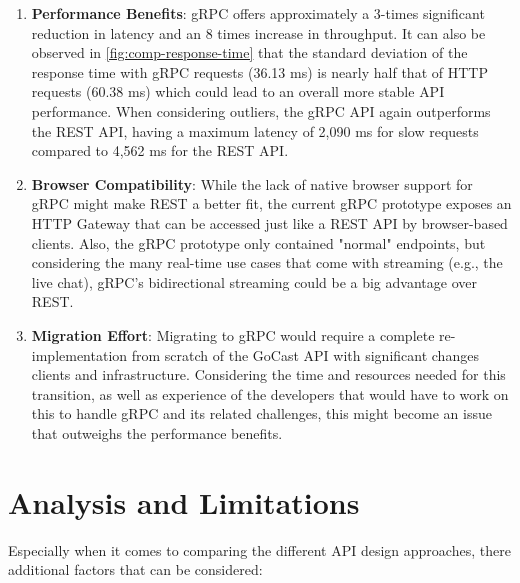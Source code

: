 \begin{enumerate}
    \item \textbf{Performance Benefits}: gRPC offers approximately a 3-times significant reduction in latency and an 8 times increase in throughput. It can also be observed in \autoref{fig:comp-response-time} that the standard deviation of the response time with gRPC requests (36.13 ms) is nearly half that of HTTP requests (60.38 ms) which could lead to an overall more stable \ac{API} performance.  When considering outliers, the gRPC \ac{API} again outperforms the REST \ac{API}, having a maximum latency of 2,090 ms for slow requests compared to 4,562 ms for the REST \ac{API}.

    \item \textbf{Browser Compatibility}: While the lack of native browser support for gRPC might make REST a better fit, the current gRPC prototype exposes an HTTP Gateway that can be accessed just like a REST API by browser-based clients. Also, the gRPC prototype only contained "normal" endpoints, but considering the many real-time use cases that come with streaming (e.g., the live chat), gRPC’s bidirectional streaming could be a big advantage over REST.

    \item \textbf{Migration Effort}: Migrating to gRPC would require a complete re-implementation from scratch of the GoCast \ac{API} with significant changes clients and infrastructure. Considering the time and resources needed for this transition, as well as experience of the developers that would have to work on this to handle gRPC and its related challenges, this might become an issue that outweighs the performance benefits.
\end{enumerate}

\section{Analysis and Limitations}

Especially when it comes to comparing the different API design approaches, there additional factors that can be considered:

